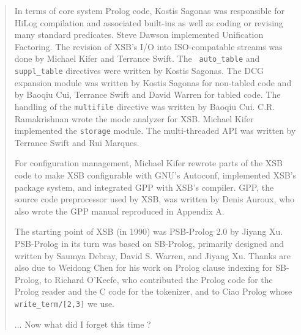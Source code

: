 \begin{quote}
In terms of core system Prolog code, Kostis Sagonas was responsible
for HiLog compilation and associated built-ins as well as coding or
revising many standard predicates.  Steve Dawson implemented
Unification Factoring.  The revision of XSB's I/O into ISO-compatable
streams was done by Michael Kifer and Terrance Swift.  The {\tt
  auto\_table} and {\tt suppl\_table} directives were written by
Kostis Sagonas.  The DCG expansion module was written by Kostis
Sagonas for non-tabled code and by Baoqiu Cui, Terrance Swift and
David Warren for tabled code.  The handling of the {\tt multifile}
directive was written by Baoqiu Cui. C.R. Ramakrishnan wrote the mode
analyzer for XSB.  Michael Kifer implemented the {\tt storage} module.
The multi-threaded API was written by Terrance Swift and Rui Marques.

For configuration management, Michael Kifer rewrote parts of the XSB
code to make XSB configurable with GNU's Autoconf, implemented XSB's
package system, and integrated GPP with XSB's compiler.  GPP, the
source code preprocessor used by XSB, was written by Denis Auroux, who
also wrote the GPP manual reproduced in Appendix A.

The starting point of XSB (in 1990) was PSB-Prolog 2.0 by Jiyang Xu.
PSB-Prolog in its turn was based on SB-Prolog, primarily designed and
written by Saumya Debray, David S. Warren, and Jiyang Xu.  Thanks are
also due to Weidong Chen for his work on Prolog clause indexing for
SB-Prolog, to Richard O'Keefe, who contributed the Prolog code for the
Prolog reader and the C code for the tokenizer, and to Ciao Prolog
whose {\tt write\_term/[2,3]} we use.

... Now what did I forget this time ?

\end{quote}

